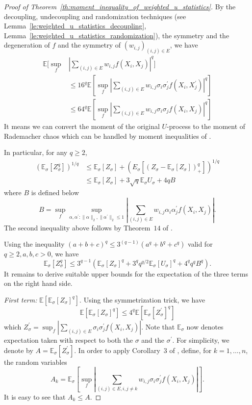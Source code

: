 \documentclass[letterpaper]{article} %
\newcommand{\E}{\mathbb{E}}
\newcommand{\rademacher}{\sigma}
\newcommand{\pair}[1]{(#1)}
\begin{document}
\begin{proof}[Proof of Theorem~\ref{th:moment_inequality_of_weighted_u_statistics}] %
By the decoupling, undecoupling and randomization techniques (see Lemma~\ref{le:weighted_u_statistics_decoupling}, Lemma~\ref{le:weighted_u_statistics_randomization}), the symmetry and the degeneration of $f$ and the symmetry of $(w_{i,j})_{\pair{i,j}\in E}$, we have
\begin{align*}
    \E[\sup_f&|\sum_{\pair{i,j}\in E}w_{i,j} f(X_i,X_j)|^q]\\
    &\le 16^q\E[\sup_f|\sum_{\pair{i,j}\in E}w_{i,j}\rademacher_i\rademacher_j^\prime f(X_i, X_j^\prime)|^q]\\
    &\le 64^q\E[\sup_f|\sum_{\pair{i,j}\in E}w_{i,j}\rademacher_i\rademacher_j f(X_i, X_j)|^q]
\end{align*}
It means we can convert the moment of the original $U$-process to the moment of Rademacher chaos which can be handled by moment inequalities of \cite{Boucheron2005}.

In particular, for any $q\ge 2$,
\begin{align*}
    (\E_\rademacher[Z_\rademacher^q])^{1/q}
    &\le \E_\rademacher[Z_\rademacher] + (E_\rademacher[(Z_\rademacher-\E_\rademacher[Z_\rademacher])_+^q])^{1/q}\\
    &\le \E_\rademacher[Z_\rademacher]+3\sqrt{q}\E_\rademacher U_\rademacher + 4qB
\end{align*}
where $B$ is defined below
\[B=\sup_f\sup_{\alpha,\alpha^\prime:\|\alpha\|_2,\|\alpha^\prime\|_2\le 1}|\sum_{\pair{i,j}\in E}w_{i,j}\alpha_i\alpha_j^\prime f(X_i,X_j)|.\]
The second inequality above follows by Theorem~$14$ of \cite{Boucheron2005}.

Using the inequality $(a+b+c)^q\le 3^{(q-1)}(a^q+b^q+c^q)$ valid for $q\ge 2,a,b,c>0$, we have
\[\E_\rademacher[Z_\rademacher^q]\le 3^{q-1}(\E_\rademacher[Z_\rademacher]^q+3^qq^{q/2}\E_\rademacher[U_\rademacher]^q+4^qq^qB^q).\]
It remains to derive suitable upper bounds for the expectation of the three terms on the right hand side.

\textit{First term:} $\E[\E_\rademacher[Z_\rademacher]^q]$. Using the symmetrization trick, we have
\[\E[\E_\rademacher[Z_\rademacher]^q]\le 4^q\E[\E_\rademacher[Z_\rademacher^\prime]^q]\]
which $Z_\rademacher^\prime = \sup_f|\sum_{\pair{i,j}\in E}\rademacher_i\rademacher_j^\prime f(X_i,X_j)|$. Note that $\E_\rademacher$ now denotes expectation taken with respect to both the $\rademacher$ and the $\rademacher^\prime$. For simplicity, we denote by $A=\E_{\rademacher}[Z_\rademacher^\prime]$. In order to apply Corollary~$3$ of \cite{Boucheron2005}, define, for $k=1,\dots,n$, the random variables
\[A_k = \E_{\rademacher}[\sup_f |\sum_{\pair{i,j}\in E,i,j\neq k}w_{i,j}\rademacher_i\rademacher_j^\prime f(X_i,X_j)|].\]
It is easy to see that $A_k\le A$.


\end{proof}
\end{document}

